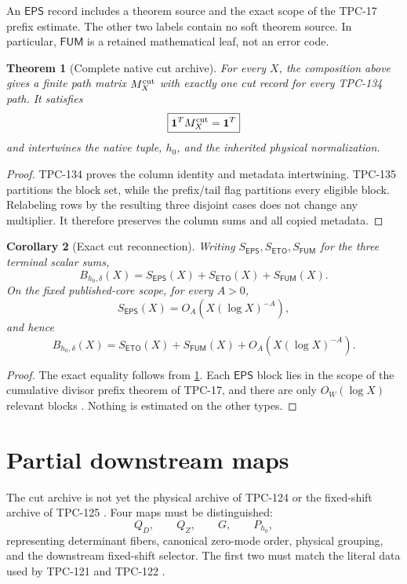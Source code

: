 \documentclass[11pt]{article}
\newtheorem{theorem}{Theorem}[section]
\newtheorem{corollary}[theorem]{Corollary}
\theoremstyle{definition}
\theoremstyle{remark}
\newcommand{\one}{\mathbf 1}
\begin{document}
An \(\mathsf{EPS}\) record includes a theorem source and the exact
scope of the TPC-17 prefix estimate.  The other two labels contain no
soft theorem source.  In particular, \(\mathsf{FUM}\) is a retained
mathematical leaf, not an error code.

\begin{theorem}[Complete native cut archive]
\label{thm:cut}
For every \(X\), the composition above gives a finite path matrix
\(M_X^{\rm cut}\) with exactly one cut record for every TPC-134 path.
It satisfies
\[
 \boxed{\one^TM_X^{\rm cut}=\one^T}
\]
and intertwines the native tuple, \(h_0\), and the inherited physical
normalization.
\end{theorem}

\begin{proof}
TPC-134 proves the column identity and metadata intertwining.  TPC-135
partitions the block set, while the prefix/tail flag partitions every
eligible block.  Relabeling rows by the resulting three disjoint cases
does not change any multiplier.  It therefore preserves the column
sums and all copied metadata.
\end{proof}

\begin{corollary}[Exact cut reconnection]
\label{cor:reconnection}
Writing \(S_{\mathsf{EPS}},S_{\mathsf{ETO}},S_{\mathsf{FUM}}\) for
the three terminal scalar sums,
\[
 \boxed{
 B_{h_0,\delta}(X)=
 S_{\mathsf{EPS}}(X)+S_{\mathsf{ETO}}(X)+S_{\mathsf{FUM}}(X).}
\]
On the fixed published-core scope, for every \(A>0\),
\[
 S_{\mathsf{EPS}}(X)=O_A(X(\log X)^{-A}),
\]
and hence
\[
 B_{h_0,\delta}(X)=
 S_{\mathsf{ETO}}(X)+S_{\mathsf{FUM}}(X)
 +O_A(X(\log X)^{-A}).
\]
\end{corollary}

\begin{proof}
The exact equality follows from \cref{thm:cut}.  Each
\(\mathsf{EPS}\) block lies in the scope of the cumulative divisor
prefix theorem of TPC-17, and there are only \(O_W(\log X)\) relevant
blocks \citep{WangTPC17}.  Nothing is estimated on the other types.
\end{proof}

\section{Partial downstream maps}

The cut archive is not yet the physical archive of TPC-124 or the
fixed-shift archive of TPC-125
\citep{WangTPC124,WangTPC125}.  Four maps must be distinguished:
\[
 Q_D,\qquad Q_Z,\qquad G,\qquad P_{h_0},
\]
representing determinant fibers, canonical zero-mode order, physical
grouping, and the downstream fixed-shift selector.  The first two
must match the literal data used by TPC-121 and TPC-122
\citep{WangTPC121,WangTPC122}.
\end{document}
